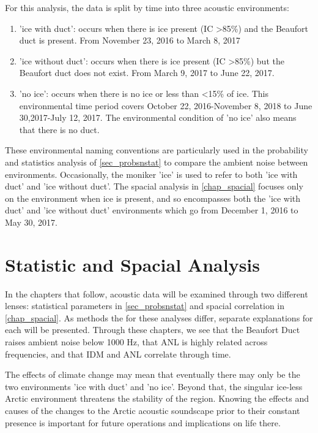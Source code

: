 For this analysis, the data is split by time into three acoustic environments:
\begin{enumerate}
    \item{'ice with duct': occurs when there is ice present (IC >85\%) and the Beaufort duct is present. From November 23, 2016 to March 8, 2017}
    \item{'ice without duct': occurs when there is ice present  (IC >85\%) but the Beaufort duct does not exist. From March 9, 2017 to June 22, 2017.    }
    \item{'no ice': occurs when there is no ice or less than <15\% of ice. This environmental time period covers October 22, 2016-November 8, 2018 to June 30,2017-July 12, 2017. The environmental condition of 'no ice' also means that there is no duct.}
\end{enumerate}

These environmental naming conventions are particularly used in the probability and statistics analysis of \autoref{sec_probsnstat} to compare the ambient noise between environments. Occasionally, the moniker 'ice' is used to refer to both 'ice with duct' and 'ice without duct'. The spacial analysis in \autoref{chap_spacial} focuses only on the environment when ice is present, and so encompasses both the 'ice with duct' and 'ice without duct' environments which go from December 1, 2016 to May 30, 2017. 


\section{Statistic and Spacial Analysis}

In the chapters that follow, acoustic data will be examined through two different lenses: statistical parameters in \autoref{sec_probsnstat} and spacial correlation in \autoref{chap_spacial}. As methods the for these analyses differ, separate explanations for each will be presented. Through these chapters, we see that the Beaufort Duct raises ambient noise below 1000 Hz, that ANL is highly related across frequencies, and that IDM and ANL correlate through time.

The effects of climate change may mean that eventually there may only be the two environments 'ice with duct' and 'no ice'. Beyond that, the singular ice-less Arctic environment threatens the stability of the region. Knowing the effects and causes of the changes to the Arctic acoustic soundscape prior to their constant presence is important for future operations and implications on life there. 


